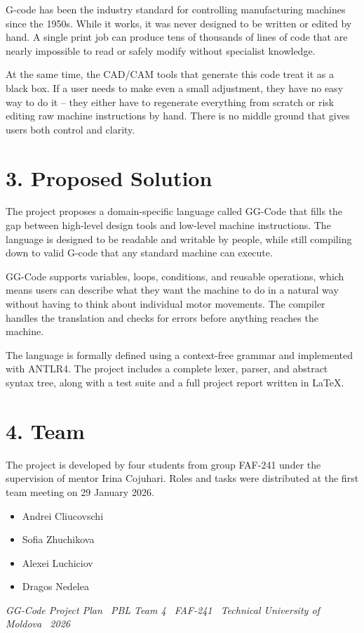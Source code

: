 G-code has been the industry standard for controlling manufacturing machines since the 1950s.
While it works, it was never designed to be written or edited by hand. A single print job can
produce tens of thousands of lines of code that are nearly impossible to read or safely modify
without specialist knowledge.

At the same time, the CAD/CAM tools that generate this code treat it as a black box. If a user
needs to make even a small adjustment, they have no easy way to do it -- they either have to
regenerate everything from scratch or risk editing raw machine instructions by hand. There is
no middle ground that gives users both control and clarity.

\section*{3. Proposed Solution}

The project proposes a domain-specific language called GG-Code that fills the gap between
high-level design tools and low-level machine instructions. The language is designed to be
readable and writable by people, while still compiling down to valid G-code that any standard
machine can execute.

GG-Code supports variables, loops, conditions, and reusable operations, which means users can
describe what they want the machine to do in a natural way without having to think about
individual motor movements. The compiler handles the translation and checks for errors before
anything reaches the machine.

The language is formally defined using a context-free grammar and implemented with ANTLR4.
The project includes a complete lexer, parser, and abstract syntax tree, along with a test
suite and a full project report written in \LaTeX.

\section*{4. Team}

The project is developed by four students from group FAF-241 under the supervision of mentor
Irina Cojuhari. Roles and tasks were distributed at the first team meeting on 29 January 2026.

\begin{itemize}[leftmargin=2em, label={--}]
    \item Andrei Cliucovschi
    \item Sofia Zhuchikova
    \item Alexei Luchiciov
    \item Dragos Nedelea
\end{itemize}

\vspace{2em}
\begin{center}
    \small\textit{GG-Code Project Plan \textbar\ PBL Team 4 \textbar\ FAF-241 \textbar\ Technical University of Moldova \textbar\ 2026}
\end{center}

